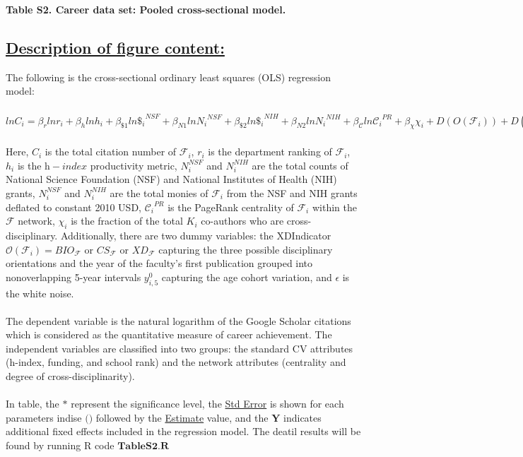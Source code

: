 \documentclass{article}\usepackage[]{graphicx}\usepackage[]{color}
\begin{document}
\begin{center}
\par{\textbf{Table S2. Career data set: Pooled cross-sectional model.}}
\end{center}
\subsection*{\underline{Description of figure content:}}
\par{
The following is the cross-sectional ordinary least squares (OLS) regression model:
\\\\ $lnC_i = {{\beta}_r}ln{r_i} + {{\beta}_h}ln{h_i} + {{\beta}_{\$1}}ln{{\$_i}^{NSF}} + {{\beta}_{N1}}ln{{N_i}^{NSF}} + {{\beta}_{\$2}}ln{{\$_i}^{NIH}} + {{\beta}_{N2}}ln{{N_i}^{NIH}} + {{\beta}_{\mathscr{C}}}ln{{\mathscr{C}_i}^{PR}} + {{\beta}_{\chi}}{{\chi}_i} + D(O(\mathcal{F}_i)) + D(y_{i,5}^0) + {\beta}_o + \epsilon $ \\\\
Here, $C_i$ is the total citation number of $\mathcal{F}_i$, $r_i$ is the department ranking of $\mathcal{F}_i$, $h_i$ is the $\textit{h}-index$ productivity metric, $N_i^{NSF}$ and $N_i^{NIH}$ are the total counts of National Science Foundation (NSF) and National Institutes of Health (NIH) grants, $N_i^{NSF}$ and $N_i^{NIH}$ are the total monies of $\mathcal{F}_i$ from the NSF and NIH grants deflated to constant 2010 USD, ${\mathscr{C}_i}^{PR}$ is the PageRank centrality of $\mathcal{F}_i$ within the $\mathcal{F}$ network, $\chi_i$ is the fraction of the total $K_i$ co-authors who are cross-disciplinary. Additionally, there are two dummy variables: the XDIndicator $\mathscr{O}(\mathcal{F}_i) = BIO_\mathcal{F}$ or $CS_\mathcal{F}$ or $XD_\mathcal{F}$ capturing the three possible disciplinary orientations and the year of the faculty’s first publication grouped into nonoverlapping 5-year intervals $y_{i,5}^0$ capturing the age cohort variation, and $\epsilon$ is the white noise. \\\\
The dependent variable is the natural logarithm of the Google Scholar citations which is considered as the quantitative measure of career achievement. The independent variables are classified into two groups: the standard CV attributes (h-index, funding, and school rank) and the network attributes (centrality and degree of cross-disciplinarity). \\\\
In table, the $\textbf{*}$ represent the significance level, the \underline{Std Error} is shown for each parameters indise $\textbf{()}$ followed by the \underline{Estimate} value, and the $\textbf{Y}$ indicates additional fixed effects included in the regression model. The deatil results will be found by running R code $\textbf{TableS2.R}$
}
\end{document}
